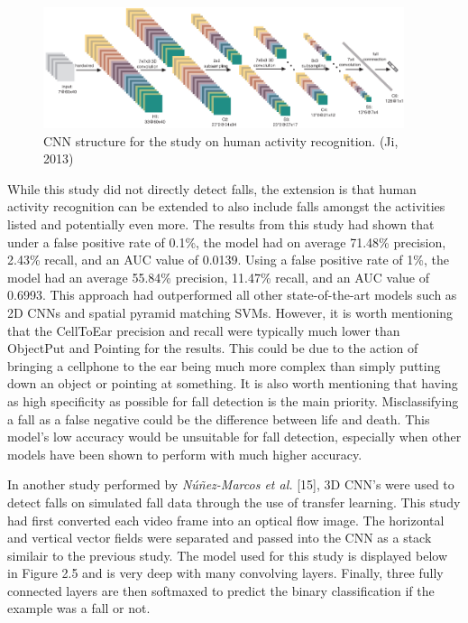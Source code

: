 \begin{figure}[H]
    \centering
    \includegraphics[width=400px, keepaspectratio]{conv1.png}
    \vspace{1ex}%
    \caption{CNN structure for the study on human activity recognition. (Ji, 2013)}
    \label{fig:my_label}
\end{figure}

While this study did not directly detect falls, the extension is that human activity recognition can be extended to also include falls amongst the activities listed and potentially even more. The results from this study had shown that under a false positive rate of 0.1\%, the model had on average 71.48\% precision, 2.43\% recall, and an AUC value of 0.0139. Using a false positive rate of 1\%, the model had an average  55.84\% precision, 11.47\% recall, and an AUC value of 0.6993. This approach had outperformed all other state-of-the-art models such as  2D CNNs and spatial pyramid matching SVMs. However, it is worth mentioning that the CellToEar precision and recall were typically much lower than ObjectPut and Pointing for the results. This could be due to the action of bringing a cellphone to the ear being much more complex than simply putting down an object or pointing at something. It is also worth mentioning that having as high specificity as possible for fall detection is the main priority. Misclassifying a fall as a false negative could be the difference between life and death. This model's low accuracy would be unsuitable for fall detection, especially when other models have been shown to perform with much higher accuracy. 

In another study performed by \textit{Núñez-Marcos et al.} [15], 3D CNN's were used to detect falls on simulated fall data through the use of transfer learning. This study had first converted each video frame into an optical flow image. The horizontal and vertical vector fields were separated and passed into the CNN as a stack similair to the previous study. The model used for this study is displayed below in Figure 2.5 and is very deep with many convolving layers. Finally, three fully connected layers are then softmaxed to predict the binary classification if the example was a fall or not.

